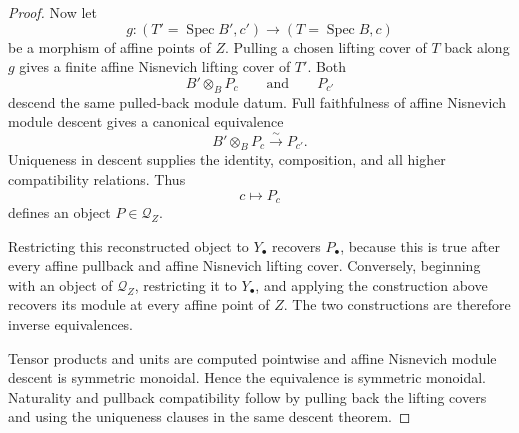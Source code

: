 \begin{proof}
Now let
\[
    g:(T'=\operatorname{Spec}B',c')
    \longrightarrow
    (T=\operatorname{Spec}B,c)
\]
be a morphism of affine points of \(Z\).  Pulling a chosen lifting cover of \(T\) back along \(g\) gives a finite affine Nisnevich lifting cover of \(T'\).  Both
\[
    B'\otimes_BP_c
    \qquad\text{and}\qquad
    P_{c'}
\]
descend the same pulled-back module datum.  Full faithfulness of affine Nisnevich module descent gives a canonical equivalence
\[
    \boxed{
    B'\otimes_BP_c
    \xrightarrow{\sim}
    P_{c'}.
    }
\]
Uniqueness in descent supplies the identity, composition, and all higher compatibility relations.  Thus
\[
    c\longmapsto P_c
\]
defines an object \(P\in\mathcal Q_Z\).

Restricting this reconstructed object to \(Y_\bullet\) recovers \(P_\bullet\), because this is true after every affine pullback and affine Nisnevich lifting cover.  Conversely, beginning with an object of \(\mathcal Q_Z\), restricting it to \(Y_\bullet\), and applying the construction above recovers its module at every affine point of \(Z\).  The two constructions are therefore inverse equivalences.

Tensor products and units are computed pointwise and affine Nisnevich module descent is symmetric monoidal.  Hence the equivalence is symmetric monoidal.  Naturality and pullback compatibility follow by pulling back the lifting covers and using the uniqueness clauses in the same descent theorem.
\end{proof}

